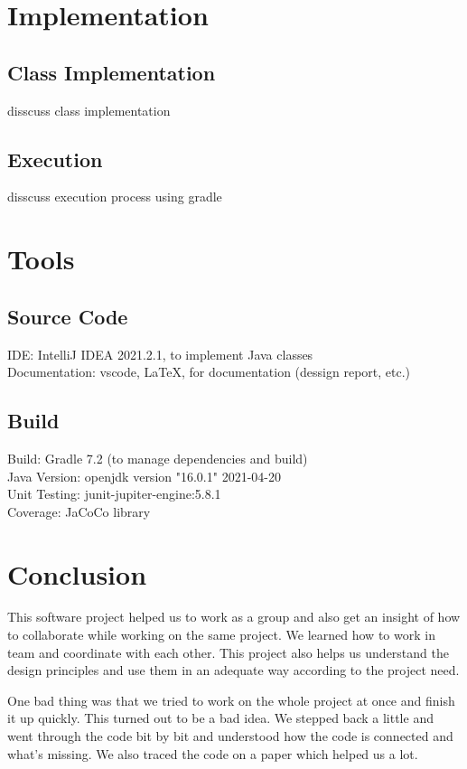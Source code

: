 \documentclass[12pt, dvipsnames, a4paper]{article}
\begin{document}
\clearpage

\section{Implementation}
\subsection{Class Implementation}
disscuss class implementation
\subsection{Execution}
disscuss execution process using gradle
\section{Tools}
\subsection{Source Code}
IDE: IntelliJ IDEA 2021.2.1, to implement Java classes\\
Documentation: vscode, \LaTeX, for documentation (dessign report, etc.)
\subsection{Build}
Build: Gradle 7.2 (to manage dependencies and build)\\
Java Version: openjdk version "16.0.1" 2021-04-20\\
Unit Testing: junit-jupiter-engine:5.8.1\\
Coverage: JaCoCo library
\section{Conclusion}

This software project helped us to work as a group and also get an insight of how to collaborate while working on the same project. We learned how to work in team and coordinate with each other. This project also helps us understand the design principles and use them in an adequate way according to the project need. 

One bad thing was that we tried to work on the whole project at once and finish it up quickly. This turned out to be a bad idea. We stepped back a little and went through the code bit by bit and understood how the code is connected and what’s missing. We also traced the code on a paper which helped us a lot. 
\end{document}
